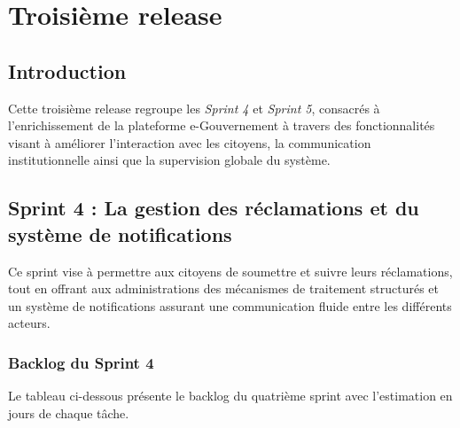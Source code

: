 \chapter{Troisième release}

\section{Introduction}
Cette troisième release regroupe les \textit{Sprint 4} et \textit{Sprint 5}, consacrés à l’enrichissement de la plateforme e-Gouvernement à travers des fonctionnalités visant à améliorer l’interaction avec les citoyens, la communication institutionnelle ainsi que la supervision globale du système.


\section{Sprint 4 : La gestion des réclamations et du système de notifications}

Ce sprint vise à permettre aux citoyens de soumettre et suivre leurs réclamations, tout en offrant aux administrations des mécanismes de traitement structurés et un système de notifications assurant une communication fluide entre les différents acteurs.

\subsection{Backlog du Sprint 4}

Le tableau ci-dessous présente le backlog du quatrième sprint avec l'estimation en jours de chaque tâche.

